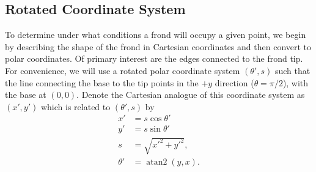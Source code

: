 \documentclass[ms,cpyr,lof,lot]{uathesis}
\DeclareMathOperator{\atantwo}{atan2}
\begin{document}
\subsection{Rotated Coordinate System}
\label{sec:rot_coords}
To determine under what conditions a frond will occupy a given point, we begin by
describing the shape of the frond in Cartesian coordinates and then convert to polar coordinates.
Of primary interest are the edges connected to the frond tip.
For convenience, we will use a rotated polar coordinate system $(\theta',s)$ such that the line connecting the base to the tip points in the $+y$ direction ($\theta=\pi/2$), with the base at $(0,0)$.
Denote the Cartesian analogue of this coordinate system as $(x',y')$ which is related to $(\theta',s)$ by
\begin{align*}
	x' &= s\cos\theta' \\
	y' &= s\sin\theta' \\
	s &= \sqrt{x'^2+y'^2}, \\
	\theta' &= \atantwo(y, x).
\end{align*}
\end{document}
